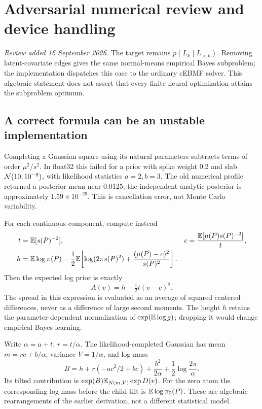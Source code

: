 \clearpage
\section{Adversarial numerical review and device handling}
\label{sec:numerical-audit}
\textit{Review added 16 September 2026.} The target remains
\(p(L_k\mid L_{<k})\). Removing latent-covariate edges gives the same
normal-means empirical Bayes subproblem; the implementation dispatches this
case to the ordinary cEBMF solver. This algebraic statement does not assert
that every finite neural optimization attains the subproblem optimum.

\subsection{A correct formula can be an unstable implementation}
Completing a Gaussian square using its natural parameters subtracts terms
of order \(\mu^2/s^2\). In float32 this failed for a prior with spike weight
0.2 and slab \(\mathcal N(10,10^{-8})\), with likelihood statistics \(a=2,b=3\).
The old numerical profile returned a posterior mean near 0.0125; the
independent analytic posterior is approximately \(1.59\times10^{-29}\).
This is cancellation error, not Monte Carlo variability.

For each continuous component, compute instead
\begin{align}
t&=\mathbb E[s(P)^{-2}], &
c&=\frac{\mathbb E[\mu(P)s(P)^{-2}]}{t},\\
h&=\mathbb E\log\pi(P)-\frac12\mathbb E\!\left[
 \log(2\pi s(P)^2)+\frac{(\mu(P)-c)^2}{s(P)^2}\right].
\end{align}
Then the expected log prior is exactly
\[
A(v)=h-\tfrac12t(v-c)^2.
\]
The spread in this expression is evaluated as an average of squared
centered differences, never as a difference of large second moments.
The height \(h\) retains the parameter-dependent normalization of
\(\exp(\mathbb E\log g)\); dropping it would change empirical Bayes learning.

Write \(\alpha=a+t\), \(r=t/\alpha\). The likelihood-completed Gaussian
has mean \(m=rc+b/\alpha\), variance \(V=1/\alpha\), and log mass
\begin{equation}
B=h+r(-ac^2/2+bc)+\frac{b^2}{2\alpha}
  +\frac12\log\frac{2\pi}{\alpha}.
\end{equation}
Its tilted contribution is \(\exp(B)\mathbb E_{N(m,V)}\exp D(v)\).
For the zero atom the corresponding log mass before the child tilt is
\(\mathbb E\log\pi_0(P)\). These are algebraic rearrangements of the earlier
derivation, not a different statistical model.

